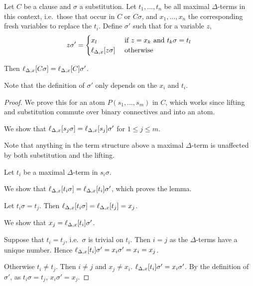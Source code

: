 \documentclass[,%
	paper=a4,%
	DIV14, 
	liststotoc,
	bibtotoc,
	draft=false,%
	numbers=noendperiod
]{scrartcl}
\newcommand{\lif}[1]{\lift{\Delta}{#1}{x}}
\begin{document}
\begin{lemma}
	\label{lemma:lif}

	Let $C$ be a clause and $\sigma$ a substitution.
	Let $t_1,\ldots,t_n$ be all maximal $\Delta$-terms in this context, i.e.\ those that occur in $C$ or $C\sigma$,  and 
	$x_1, \ldots, x_n$ the corresponding fresh variables to replace the $t_i$.
	Define $\sigma'$ such that for a variable $z$, 
	\[
		z \sigma' =
		\begin{cases} 
			x_l & \text{ if } z = x_k \text{ and } t_k\sigma = t_l  \\
			\lif{z\sigma} & \text{ otherwise}
		\end{cases} 
	\]

	Then
	$\lif{C\sigma} =
	\lif{C}\sigma'$.
\end{lemma}
Note that the definition of $\sigma'$ only depends on the $x_i$ and $t_i$.
\begin{proof}
	We prove this for an atom $P(s_1, \ldots, s_m)$ in $C$, which works since lifting and substitution commute over binary connectives and into an atom.

	We show that 
	$\lif{s_j \sigma} = \lif{s_j}\sigma'$ for $1 \leq j \leq m$.


	Note that anything in the term structure above a maximal $\Delta$-term is unaffected by both substitution and the lifting.

	Let $t_i$ be a maximal $\Delta$-term in $s_i \sigma$.

	We show that $ \lif{ t_i \sigma } = \lif{ t_i } \sigma'$, which proves the lemma.

	Let $t_i\sigma = t_j$. Then $\lif{ t_i\sigma} = \lif{t_j} = x_j$.

	We show that $x_j = \lif{t_i}\sigma'$.

	Suppose that $t_i = t_j$, i.e.\ $\sigma$ is trivial on $t_i$.
	Then $i=j$ as the $\Delta$-terms have a unique number.
	Hence $\lif{t_i}\sigma' = x_i \sigma' = x_i = x_j$.


	Otherwise $t_i \neq t_j$. Then $i\neq j$ and  $x_j \neq x_i$.\newline
	$\lif{t_i}\sigma' = x_i \sigma'$.
	By the definition of $\sigma'$, as $t_i\sigma = t_j$, $x_i\sigma' = x_j$.
	\begin{comment}
		Suppose no $\Delta$-colored symbol occurs in $s_j$ or $s_j\sigma$. Then $\lif{s_j\sigma} = s_j\sigma $. this equals $  s_j\sigma'$ as there, only the second case applies, where the lifting doesn't affect the term.

		Suppose a maximal $\Delta$-colored term $t_i$ occurs in $s_j\sigma$ but not in $s_j$ and suppose it's the only one in $s_j\sigma$.
		Then $\lif{ s_j\sigma } = \lif{ s_j\sigma^{t_i} }= s_j\sigma^{t_i} \abstraction{t_i/x_i} = \lif{s_j} \sigma^{t_i} \abstraction{t_i/x_i}$
	\end{comment}
\end{proof}
\end{document}
